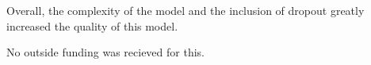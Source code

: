 \documentclass{article}
\begin{document}
    Overall, the complexity of the model and the inclusion of dropout greatly increased the 
    quality of this model. 

\begin{ack}

    No outside funding was recieved for this.


\end{ack}





{
\small
    \nocite{*}
    
}

\end{document}

